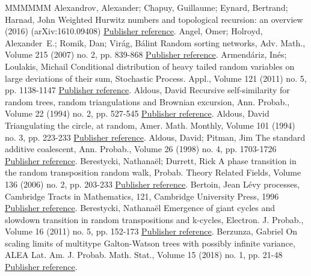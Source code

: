 \documentclass[11pt]{article}
\theoremstyle{definition}
\numberwithin{equation}{section}
\numberwithin{figure}{section}
\numberwithin{table}{section}
\begin{document}
\begin{thebibliography}{MMMMMM}
 Alexandrov, Alexander; Chapuy, Guillaume; Eynard, Bertrand; Harnad, John Weighted Hurwitz numbers and topological recursion: an overview (2016) (arXiv:1610.09408) \href{https://ahl.centre-mersenne.org/item/AHL_2018__1__149_0/#ACEH16}{Publisher reference}.
 Angel, Omer; Holroyd, Alexander E.; Romik, Dan; Virág, Bálint Random sorting networks, Adv. Math., Volume 215 (2007) no. 2, pp. 839-868 \href{https://ahl.centre-mersenne.org/item/AHL_2018__1__149_0/#AHRV07}{Publisher reference}.
 Armendáriz, Inés; Loulakis, Michail Conditional distribution of heavy tailed random variables on large deviations of their sum, Stochastic Process. Appl., Volume 121 (2011) no. 5, pp. 1138-1147 \href{https://ahl.centre-mersenne.org/item/AHL_2018__1__149_0/#AL11}{Publisher reference}.
 Aldous, David Recursive self-similarity for random trees, random triangulations and Brownian excursion, Ann. Probab., Volume 22 (1994) no. 2, pp. 527-545 \href{https://ahl.centre-mersenne.org/item/AHL_2018__1__149_0/#Ald94a}{Publisher reference}.
 Aldous, David Triangulating the circle, at random, Amer. Math. Monthly, Volume 101 (1994) no. 3, pp. 223-233 \href{https://ahl.centre-mersenne.org/item/AHL_2018__1__149_0/#Ald94b}{Publisher reference}.
 Aldous, David; Pitman, Jim The standard additive coalescent, Ann. Probab., Volume 26 (1998) no. 4, pp. 1703-1726 \href{https://ahl.centre-mersenne.org/item/AHL_2018__1__149_0/#AP98}{Publisher reference}.
 Berestycki, Nathanaël; Durrett, Rick A phase transition in the random transposition random walk, Probab. Theory Related Fields, Volume 136 (2006) no. 2, pp. 203-233 \href{https://ahl.centre-mersenne.org/item/AHL_2018__1__149_0/#BD06}{Publisher reference}.
 Bertoin, Jean Lévy processes, Cambridge Tracts in Mathematics, 121, Cambridge University Press, 1996 \href{https://ahl.centre-mersenne.org/item/AHL_2018__1__149_0/#Ber96}{Publisher reference}.
 Berestycki, Nathanaël Emergence of giant cycles and slowdown transition in random transpositions and k-cycles, Electron. J. Probab., Volume 16 (2011) no. 5, pp. 152-173 \href{https://ahl.centre-mersenne.org/item/AHL_2018__1__149_0/#Ber11}{Publisher reference}.
 Berzunza, Gabriel On scaling limits of multitype Galton-Watson trees with possibly infinite variance, ALEA Lat. Am. J. Probab. Math. Stat., Volume 15 (2018) no. 1, pp. 21-48 \href{https://ahl.centre-mersenne.org/item/AHL_2018__1__149_0/#Ber16}{Publisher reference}.

\end{thebibliography}
\end{document}
